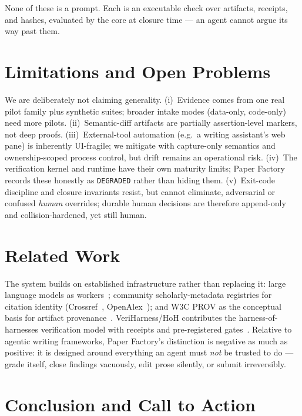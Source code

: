 \documentclass[10pt,twocolumn]{article}
\begin{document}
None of these is a prompt. Each is an executable check over artifacts,
receipts, and hashes, evaluated by the core at closure time --- an agent
cannot argue its way past them.

\section{Limitations and Open Problems}

We are deliberately not claiming generality. (i)~Evidence comes from one real
pilot family plus synthetic suites; broader intake modes (data-only,
code-only) need more pilots. (ii)~Semantic-diff artifacts are partially
assertion-level markers, not deep proofs. (iii)~External-tool automation
(e.g.\ a writing assistant's web pane) is inherently UI-fragile; we mitigate
with capture-only semantics and ownership-scoped process control, but drift
remains an operational risk. (iv)~The verification kernel and runtime have
their own maturity limits; Paper Factory records these honestly as
\texttt{DEGRADED} rather than hiding them. (v)~Exit-code discipline and
closure invariants resist, but cannot eliminate, adversarial or confused
\emph{human} overrides; durable human decisions are therefore
append-only and collision-hardened, yet still human.

\section{Related Work}

The system builds on established infrastructure rather than replacing it:
large language models as workers~\cite{vaswani2017attention}; community
scholarly-metadata registries for citation identity
(Crossref~\cite{hendricks2020crossref}, OpenAlex~\cite{priem2022openalex});
and W3C PROV as the conceptual basis for artifact
provenance~\cite{lebo2013prov}. VeriHarness/HoH contributes the
harness-of-harnesses verification model with receipts and pre-registered
gates~\cite{skzl2026veriharness}. Relative to agentic writing frameworks,
Paper Factory's distinction is negative as much as positive: it is designed
around everything an agent must \emph{not} be trusted to do --- grade itself,
close findings vacuously, edit prose silently, or submit irreversibly.

\section{Conclusion and Call to Action}
\end{document}
